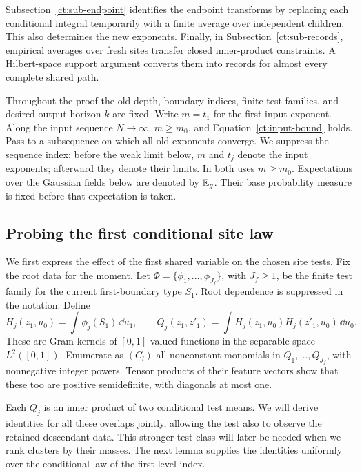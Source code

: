Subsection~\ref{ct:sub-endpoint} identifies the endpoint transforms by
replacing each conditional
integral temporarily with a finite average over independent children.
This also determines the new exponents.  Finally, in
Subsection~\ref{ct:sub-records}, empirical averages over
fresh sites transfer closed inner-product constraints.  A Hilbert-space
support argument converts them into records for almost every complete
shared path.

Throughout the proof the old depth, boundary indices, finite test
families, and desired output horizon $k$ are fixed.  Write $m=t_1$ for
the first input exponent.  Along the input sequence $N\to\infty$,
$m\ge m_0$, and Equation~\eqref{ct:input-bound} holds.  Pass to a
subsequence on which all old exponents converge. We suppress the sequence
index: before the weak limit below, $m$ and $t_j$ denote the input
exponents; afterward they denote their limits. In both uses $m\ge m_0$.
Expectations over the Gaussian fields below are denoted by $\mathbb E_g$.
Their base probability measure is fixed before that expectation is
taken.

\subsection{Probing the first conditional site law}\label{ct:sub-probing}

We first express the effect of the first shared variable on the chosen
site tests.  Fix the root data for the moment.
Let $\Phi=\{\phi_1,\ldots,\phi_{J_f}\}$, with $J_f\ge1$, be the finite test family
for the current first-boundary type $S_1$.  Root dependence is suppressed
in the notation.  Define
\begin{equation}\label{ct:features}
 H_j(z_1,u_0)=\int\phi_j(S_1)\,\dd u_1,
 \qquad
 Q_j(z_1,z'_1)=\int H_j(z_1,u_0)H_j(z'_1,u_0)\,\dd u_0.
\end{equation}
These are Gram kernels of $[0,1]$-valued functions in the separable
space $L^2([0,1])$.  Enumerate as $(C_l)$ all nonconstant monomials in
$Q_1,\ldots,Q_{J_f}$, with nonnegative integer powers.  Tensor products of
their feature vectors show that these too are positive semidefinite,
with diagonals at most one.

Each $Q_j$ is an inner product of two conditional test means.  We
will derive identities for all these overlaps jointly, allowing the test
also to observe the retained descendant data.  This stronger test class
will later be needed when we rank clusters by their masses.  The next
lemma supplies the identities uniformly over the conditional law of the
first-level index.

